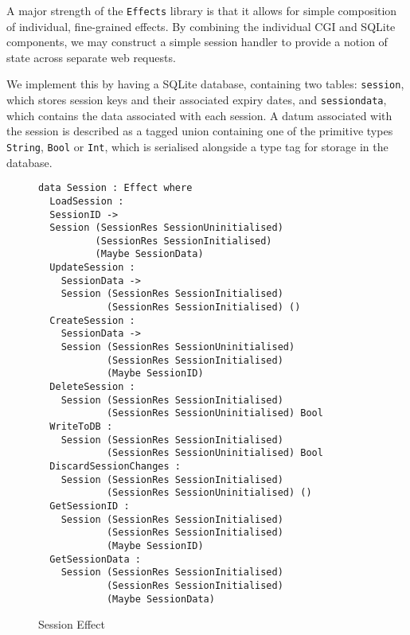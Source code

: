 \documentclass[preprint]{sigplanconf}
\begin{document}
A major strength of the \texttt{Effects} library is that it allows for simple composition of individual, fine-grained effects. By combining the individual CGI and SQLite components, we may construct a simple session handler to provide a notion of state across separate web requests. 

We implement this by having a SQLite database, containing two tables: \texttt{session}, which stores session keys and their associated expiry dates, and \texttt{sessiondata}, which contains the data associated with each session. A datum associated with the session is described as a tagged union containing one of the primitive types \texttt{String}, \texttt{Bool} or \texttt{Int}, which is serialised alongside a type tag for storage in the database.

\begin{figure}[h]
\begin{Verbatim}[samepage]
data Session : Effect where
  LoadSession : 
  SessionID -> 
  Session (SessionRes SessionUninitialised) 
          (SessionRes SessionInitialised) 
          (Maybe SessionData)
  UpdateSession : 
    SessionData -> 
    Session (SessionRes SessionInitialised) 
            (SessionRes SessionInitialised) ()
  CreateSession : 
    SessionData -> 
    Session (SessionRes SessionUninitialised) 
            (SessionRes SessionInitialised) 
            (Maybe SessionID)
  DeleteSession : 
    Session (SessionRes SessionInitialised) 
            (SessionRes SessionUninitialised) Bool 
  WriteToDB : 
    Session (SessionRes SessionInitialised) 
            (SessionRes SessionUninitialised) Bool
  DiscardSessionChanges : 
    Session (SessionRes SessionInitialised) 
            (SessionRes SessionUninitialised) ()
  GetSessionID : 
    Session (SessionRes SessionInitialised) 
            (SessionRes SessionInitialised) 
            (Maybe SessionID)
  GetSessionData : 
    Session (SessionRes SessionInitialised) 
            (SessionRes SessionInitialised) 
            (Maybe SessionData)
\end{Verbatim}
\caption{Session Effect}
\label{fig:sessioneffect}
\end{figure}
\end{document}
